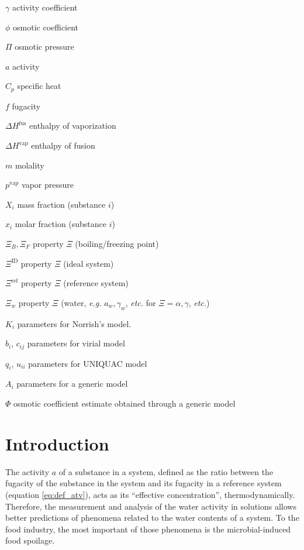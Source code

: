 \documentclass[
	12pt,				%
	openright,
	twoside,
	a4paper,			%
	brazil,			%
	french,				%
	english				%
	]{abntex2}
\begin{document}
\begin{simbolos}
	\item[$ \gamma $] activity coefficient
	\item[$ \phi $] osmotic coefficient
	\item[$ \Pi $] osmotic pressure
	\item[$ a $] activity
	\item[$ C_p $] specific heat
	\item[$ f $] fugacity
	\item[$ \Delta H^\text{fus} $] enthalpy of vaporization
	\item[$ \Delta H^\text{vap} $] enthalpy of fusion
	\item[$ m $] molality
	\item[$ p^\text{vap} $] vapor pressure
	\item[$ X_i $] mass fraction (substance $i$)
	\item[$ x_i $] molar fraction (substance $i$)
	\item[$ \Xi_B, \Xi_F $] property $\Xi$ (boiling/freezing point)
	\item[$ \Xi^\text{ID} $] property $\Xi$ (ideal system)
	\item[$ \Xi^\text{ref} $] property $\Xi$ (reference system)
	\item[$ \Xi_w $] property $\Xi$ (water, \textit{e.g.} $a_w, %
		\gamma_w$, \textit{etc.} %
		for $\Xi = \alpha, \gamma$, \textit{etc.})
	\item[$K_i$] parameters for Norrish's model.
	\item[$b_i$, $c_{ij}$] parameters for virial model
	\item[$q_i$, $u_{ii}$] parameters for UNIQUAC model
	\item[$A_i$] parameters for a generic model
	\item[$\Phi$] osmotic coefficient estimate obtained through a generic model
\end{simbolos}

\tableofcontents*
\cleardoublepage

\textual

\part{Introduction}

The activity $a$ of a substance in a system, defined \cite{sandler2017} as
the ratio between the fugacity of the substance in the system and its fugacity
in a reference system (equation \ref{eq:def_atv}), acts as its ``effective
concentration'', thermodynamically. Therefore, the measurement and analysis of
the water activity in solutions allows better predictions of phenomena related to
the water contents of a system. To the food industry, the most important of those
phenomena is the microbial-induced food spoilage.
\end{document}
